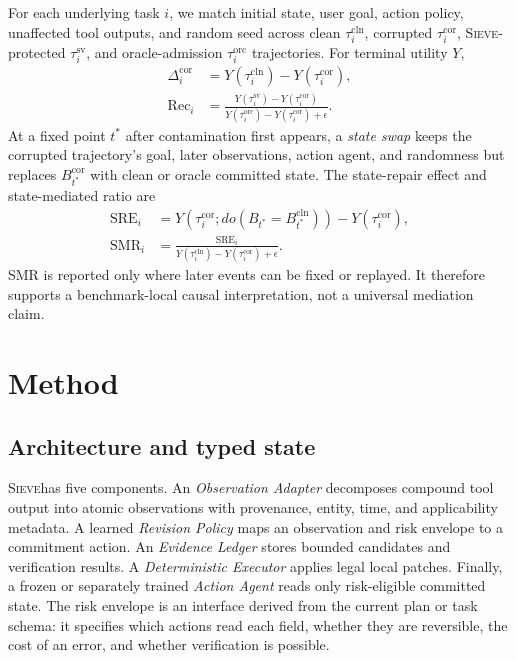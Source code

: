 \documentclass{article}
\newcommand{\method}{\textsc{Sieve}}
\begin{document}
For each underlying task $i$, we match initial state, user goal, action policy, unaffected tool outputs, and random seed across clean $\tau_i^{\mathrm{cln}}$, corrupted $\tau_i^{\mathrm{cor}}$, \method-protected $\tau_i^{\mathrm{sv}}$, and oracle-admission $\tau_i^{\mathrm{orc}}$ trajectories. For terminal utility $Y$,
\begin{align}
\Delta_i^{\mathrm{cor}}&=Y(\tau_i^{\mathrm{cln}})-Y(\tau_i^{\mathrm{cor}}),\\
\mathrm{Rec}_i&=\frac{Y(\tau_i^{\mathrm{sv}})-Y(\tau_i^{\mathrm{cor}})}
{Y(\tau_i^{\mathrm{orc}})-Y(\tau_i^{\mathrm{cor}})+\epsilon}.
\end{align}
At a fixed point $t^*$ after contamination first appears, a \emph{state swap} keeps the corrupted trajectory's goal, later observations, action agent, and randomness but replaces $B_{t^*}^{\mathrm{cor}}$ with clean or oracle committed state. The state-repair effect and state-mediated ratio are
\begin{align}
\mathrm{SRE}_i&=Y\!\left(\tau_i^{\mathrm{cor}};do(B_{t^*}=B_{t^*}^{\mathrm{cln}})\right)-Y(\tau_i^{\mathrm{cor}}),\\
\mathrm{SMR}_i&=\frac{\mathrm{SRE}_i}{Y(\tau_i^{\mathrm{cln}})-Y(\tau_i^{\mathrm{cor}})+\epsilon}.
\end{align}
SMR is reported only where later events can be fixed or replayed. It therefore supports a benchmark-local causal interpretation, not a universal mediation claim.

\section{Method}
\label{sec:method}

\subsection{Architecture and typed state}

\method has five components. An \emph{Observation Adapter} decomposes compound tool output into atomic observations with provenance, entity, time, and applicability metadata. A learned \emph{Revision Policy} maps an observation and risk envelope to a commitment action. An \emph{Evidence Ledger} stores bounded candidates and verification results. A \emph{Deterministic Executor} applies legal local patches. Finally, a frozen or separately trained \emph{Action Agent} reads only risk-eligible committed state. The risk envelope is an interface derived from the current plan or task schema: it specifies which actions read each field, whether they are reversible, the cost of an error, and whether verification is possible.
\end{document}

